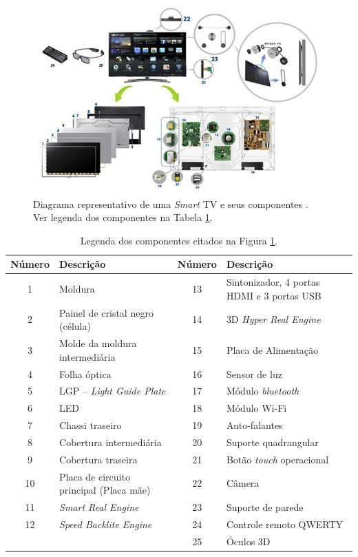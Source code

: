 \begin{figure}[!ht]
	\includegraphics[width=\textwidth]{img/smart_samsung.jpg}
	\caption{Diagrama representativo de uma \emph{Smart} TV e seus componentes \cite{samsung:smarttv}. Ver legenda dos componentes na Tabela \ref{tab:smart}.}
	\label{fig:smart_samsung}
\end{figure}

\begin{table}[!ht]
	\centering
	\caption{Legenda dos componentes citados na Figura \ref{fig:smart_samsung}.}
	\label{tab:smart}
	\begin{tabular}{c l  c l}
		\toprule
		\textbf{Número} & \textbf{Descrição} & \textbf{Número} & \textbf{Descrição}\\
		\midrule
		1 & Moldura & 13 & Sintonizador, 4 portas HDMI e 3 portas USB \\
		2 & Painel de cristal negro (célula) & 14 & 3D \emph{Hyper Real Engine}\\
		3 & Molde da moldura intermediária & 15 & Placa de Alimentação \\
		4 & Folha óptica & 16 & Sensor de luz\\
		5 & LGP -- \emph{Light Guide Plate} & 17 &  Módulo \emph{bluetooth} \\
		6 & LED & 18 & Módulo Wi-Fi\\
		7 & Chassi traseiro & 19 & Auto-falantes \\
		8 & Cobertura intermediária & 20 & Suporte quadrangular\\
		9 & Cobertura traseira & 21 & Botão \emph{touch} operacional\\
		10 & Placa de circuito principal (Placa mãe) & 22 & Câmera\\
		11 & \emph{Smart Real Engine} & 23 & Suporte de parede \\
		12 & \emph{Speed Backlite Engine} & 24 & Controle remoto QWERTY\\
		   &  & 25 & Óculos 3D \\
		\bottomrule
	\end{tabular}
\end{table}

